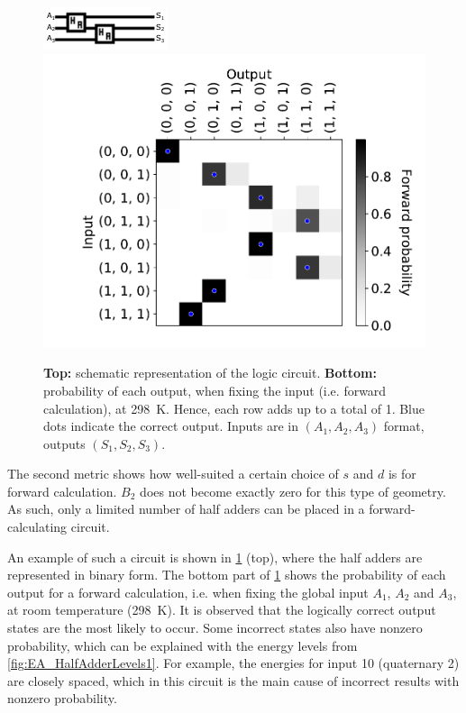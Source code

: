 \documentclass[twocolumn]{phdsymp}
\begin{document}
\begin{figure}
    \centering
    \includegraphics[width=0.5\columnwidth]{Figures/Layout_halfadderchain_annotated.pdf}
    \includegraphics[width=0.8\columnwidth]{Figures/table(d170,s-60)_forward1_probabilities_T0.0258eV.pdf}
    \caption{\textbf{Top:} schematic representation of the logic circuit. \textbf{Bottom:}
    probability of each output, when fixing the input (i.e. forward calculation), at \SI{298}{\kelvin}. Hence, each row adds up to a total of 1. Blue dots indicate the correct output. Inputs are in $(A_1, A_2, A_3)$ format, outputs $(S_1, S_2, S_3)$.}
    \label{fig:EA_HalfAdderCircuit1}
\end{figure}
The second metric shows how well-suited a certain choice of $s$ and $d$ is for forward calculation. $B_2$ does not become exactly zero for this type of geometry. As such, only a limited number of half adders can be placed in a forward-calculating circuit. \par
An example of such a circuit is shown in \cref{fig:EA_HalfAdderCircuit1} (top), where the half adders are represented in binary form. The bottom part of \cref{fig:EA_HalfAdderCircuit1} shows the probability of each output for a forward calculation, i.e. when fixing the global input $A_1$, $A_2$ and $A_3$, at room temperature (\SI{298}{\kelvin}). It is observed that the logically correct output states are the most likely to occur. Some incorrect states also have nonzero probability, which can be explained with the energy levels from \cref{fig:EA_HalfAdderLevels1}. For example, the energies for input 10 (quaternary 2) are closely spaced, which in this circuit is the main cause of incorrect results with nonzero probability.
\end{document}
